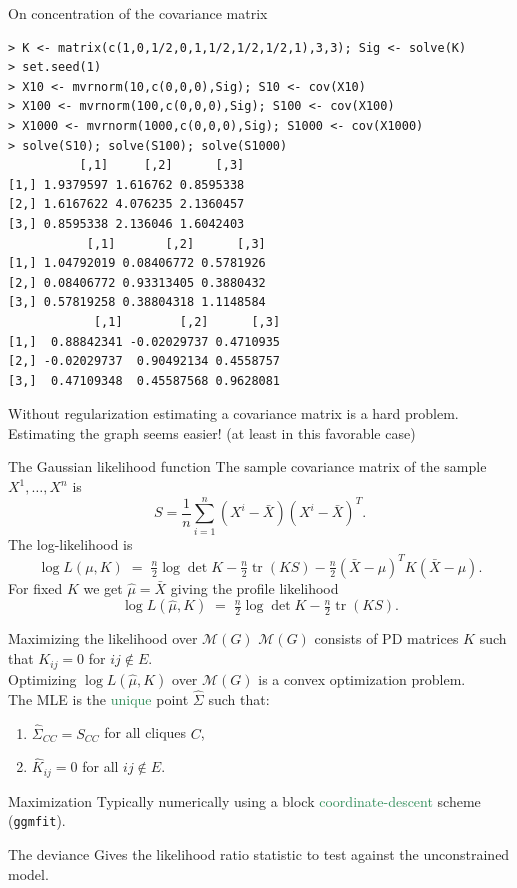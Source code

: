 \documentclass[dvipsnames,aspectratio=169]{beamer} %
\DeclareMathOperator{\tr}{tr}
\newcommand{\cM}{\mathcal{M}}
\begin{document}
\begin{frame}[fragile,label=samplcov]{On concentration of the covariance matrix}
	\begin{lstlisting}
> K <- matrix(c(1,0,1/2,0,1,1/2,1/2,1/2,1),3,3); Sig <- solve(K)
> set.seed(1)
> X10 <- mvrnorm(10,c(0,0,0),Sig); S10 <- cov(X10)
> X100 <- mvrnorm(100,c(0,0,0),Sig); S100 <- cov(X100)
> X1000 <- mvrnorm(1000,c(0,0,0),Sig); S1000 <- cov(X1000)
> solve(S10); solve(S100); solve(S1000)
          [,1]     [,2]      [,3]
[1,] 1.9379597 1.616762 0.8595338
[2,] 1.6167622 4.076235 2.1360457
[3,] 0.8595338 2.136046 1.6042403
           [,1]       [,2]      [,3]
[1,] 1.04792019 0.08406772 0.5781926
[2,] 0.08406772 0.93313405 0.3880432
[3,] 0.57819258 0.38804318 1.1148584
            [,1]        [,2]      [,3]
[1,]  0.88842341 -0.02029737 0.4710935
[2,] -0.02029737  0.90492134 0.4558757
[3,]  0.47109348  0.45587568 0.9628081\end{lstlisting}
Without regularization estimating a covariance matrix is a hard problem.\\[.2cm]
Estimating the graph seems easier! (at least in this favorable case)
\end{frame}

\begin{frame}{The Gaussian likelihood function}
	The sample covariance matrix of the sample $X^{1},\ldots,X^n$ is
	$$S=\frac{1}{n}\sum_{i=1}^n(X^i-\bar X)(X^i-\bar X)^T.$$
The log-likelihood is
$$\log L(\mu,K)\;=\;\tfrac{n}{2}\log\det K-\tfrac{n}{2}\tr(KS)-\tfrac{n}{2}(\bar X-\mu)^T K(\bar X-\mu).$$
For fixed $K$ we get $\hat\mu=\bar X$ giving the \alert{profile likelihood}
$$
\log L(\hat \mu,K)\;=\;\tfrac{n}{2}\log\det K-\tfrac{n}{2}\tr(KS).
$$
\end{frame}

\begin{frame}{Maximizing the likelihood over $\mathcal M(G)$}
$\cM(G)$ consists of PD matrices $K$ such that $K_{ij}=0$ for $ij\notin E$. \\[.3cm]

	Optimizing $\log L(\hat \mu,K)$ over $\cM(G)$ is a convex optimization problem.\\[.3cm]
	The MLE is the \textcolor{SeaGreen}{unique} point $\hat\Sigma$ such that:
	\begin{enumerate}
		\item [(i)] $\hat\Sigma_{CC}=S_{CC}$ for all cliques $C$,
		\item [(ii)] $\hat K_{ij}=0$ for all $ij\notin E$.
	\end{enumerate}
	\begin{alertblock}{Maximization}
		Typically numerically using a block \textcolor{SeaGreen}{coordinate-descent} scheme (\texttt{ggmfit}).
	\end{alertblock}
		\begin{alertblock}{The deviance}
		Gives the likelihood ratio statistic to test against the unconstrained model. 
	\end{alertblock}
\end{frame}
\end{document}

